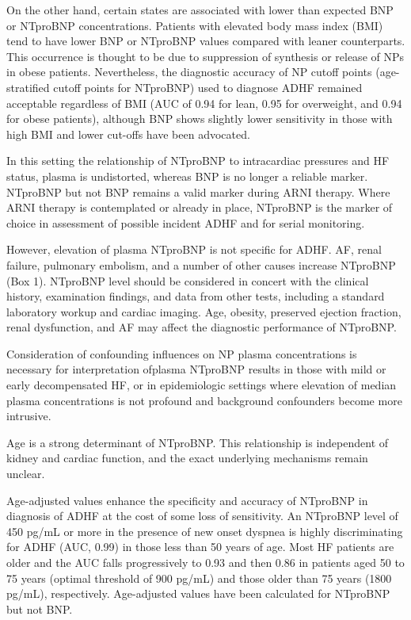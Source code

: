 \documentclass[14pt,a4paper,onecolumn]{extarticle}
\begin{document}
On the other hand, certain states are associated with lower than expected BNP or NTproBNP concentrations. Patients with elevated body mass index (BMI) tend to have lower BNP or NTproBNP values compared with leaner counterparts. This occurrence is thought to be due to suppression of synthesis or release of NPs in obese patients. Nevertheless, the diagnostic accuracy of NP cutoff points (age-stratified cutoff points for NTproBNP) used to diagnose ADHF remained acceptable regardless of BMI (AUC of 0.94 for lean, 0.95 for overweight, and 0.94 for obese patients), although BNP shows slightly lower sensitivity in those with high BMI and lower cut-offs have been advocated. \citep{Bayes-Genis2007}

In this setting the relationship of NTproBNP to intracardiac pressures and HF status, plasma is undistorted, whereas BNP is no longer a reliable marker. NTproBNP but not BNP remains a valid marker during ARNI therapy. Where ARNI therapy is contemplated or already in place, NTproBNP is the marker of choice in assessment of possible incident ADHF and for serial monitoring. \citep{Richards2018}

However, elevation of plasma NTproBNP is not specific for ADHF. AF, renal failure, pulmonary embolism, and a number of other causes increase NTproBNP (Box 1). NTproBNP level should be considered in concert with the clinical history, examination findings, and data from other tests, including a standard laboratory workup and cardiac imaging. Age, obesity, preserved ejection fraction, renal dysfunction, and AF may affect the diagnostic performance of NTproBNP. \citep{Richards2018}

Consideration of confounding influences on NP plasma concentrations is necessary for interpretation ofplasma NTproBNP results in those with mild or early decompensated HF, or in epidemiologic settings where elevation of median plasma concentrations is not profound and background confounders become more intrusive. \citep{Richards2018}

Age is a strong determinant of NTproBNP. This relationship is independent of kidney and cardiac function, and the exact underlying mechanisms remain unclear.  \citep{Richards2018}

Age-adjusted values enhance the specificity and accuracy of NTproBNP in diagnosis of ADHF at the cost of some loss of sensitivity. An NTproBNP level of 450 pg/mL or more in the presence of new onset dyspnea is highly discriminating for ADHF (AUC, 0.99) in those less than 50 years of age. Most HF patients are older and the AUC falls progressively to 0.93 and then 0.86 in patients aged 50 to 75 years (optimal threshold of 900 pg/mL) and those older than 75 years (1800 pg/mL), respectively. Age-adjusted values have been calculated for NTproBNP but not BNP. \citep{Januzzi2006a}
\end{document}
